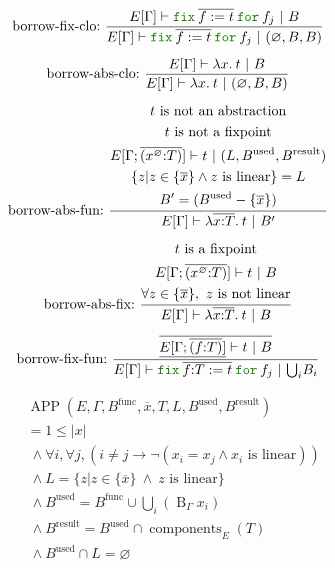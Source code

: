 \documentclass[a4paper,fleqn]{article}
\newcommand{\kwfix}{\mbox{\color{mygreen}\ttfamily fix}}
\newcommand{\kwfor}{\mbox{\color{mygreen}\ttfamily for}}
\newcommand{\lam}[2]{\lambda #1.\:#2}
\newcommand{\lassum}[2]{(#1\mathord{:}#2)}
\newcommand{\ofix}[2]{\kwfix\:{#1}\:\kwfor\:{#2}}
\newcommand{\tbigcup}{{\textstyle\bigcup}}
\newcommand{\breakrule}{\\[0.5em]}
\DeclareMathOperator{\APP}{APP}
\DeclareMathOperator{\components}{components}
\DeclareMathOperator{\Bop}{B}
\newcommand{\rep}[1]{\overline{#1}}
\begin{document}
\begin{gather*}
  \text{borrow-fix-clo:}~
    \dfrac{
      E[\Gamma] \vdash \ofix{\rep{f:=t}}{f_j} ~|~ B
    }{
      E[\Gamma] \vdash \ofix{\rep{f:=t}}{f_j} ~|~ (\varnothing, B, B)
    } \breakrule
  \text{borrow-abs-clo:}~
    \dfrac{
      E[\Gamma] \vdash \lam{x}{t} ~|~ B
    }{
      E[\Gamma] \vdash \lam{x}{t} ~|~ (\varnothing, B, B)
    } \breakrule
  \text{borrow-abs-fun:}~
    \dfrac{
      \begin{gathered}
        \text{$t$ is not an abstraction} \\
        \text{$t$ is not a fixpoint} \\
        E[\Gamma;\rep{\lassum{x^\varnothing}{T}}] \vdash t ~|~ (L,B^\text{used},B^\text{result}) \\
        \{ z | z \in \{\rep{x}\} \wedge \text{$z$ is linear} \} = L \\
        B' = (B^\text{used} - \{\rep{x}\}) \\
      \end{gathered}
    }{
      E[\Gamma] \vdash \lam{\rep{x{:}T}}{t} ~|~ B'
    } \breakrule
  \text{borrow-abs-fix:}~
    \dfrac{
      \begin{gathered}
        \text{$t$ is a fixpoint} \\
        E[\Gamma;\rep{\lassum{x^\varnothing}{T}}] \vdash t ~|~ B \\
        \forall z \in \{\rep{x}\},~ \text{$z$ is not linear} \\
      \end{gathered}
    }{
      E[\Gamma] \vdash \lam{\rep{x{:}T}}{t} ~|~ B
    } \breakrule
  \text{borrow-fix-fun:}~
    \dfrac{
      \begin{gathered}
        \rep{\underline{E[\Gamma;\rep{\lassum{f}{T}}]} \vdash t ~|~ B} \\
      \end{gathered}
    }{
      E[\Gamma] \vdash \ofix{\rep{f{:}T:=t}}{f_j} ~|~ {\tbigcup_i B_i}
    }
\end{gather*}

\begin{align*}
  &\APP(E, \Gamma, B^\text{func}, \rep{x}, T, L, B^\text{used}, B^\text{result}) \\
  &= 1 \leq |x| \\
  &~\wedge \forall i, \forall j, (i \neq j \rightarrow \neg (x_i = x_j \wedge \text{$x_i$ is linear})) \\
  &~\wedge L = \{ z | z \in \{\rep{x}\} ~\wedge~ \text{$z$ is linear} \} \\
  &~\wedge B^\text{used} = B^\text{func} \cup \tbigcup_i (\Bop_\Gamma x_i) \\
  &~\wedge B^\text{result} = B^\text{used} \cap \components_E(T) \\
  &~\wedge B^\text{used} \cap L = \varnothing \\
\end{align*}
\end{document}
